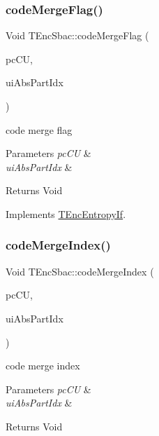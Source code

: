 \subsubsection{\texorpdfstring{code\+Merge\+Flag()}{codeMergeFlag()}}
{\footnotesize\ttfamily Void T\+Enc\+Sbac\+::code\+Merge\+Flag (\begin{DoxyParamCaption}\item[{\hyperlink{class_t_com_data_c_u}{T\+Com\+Data\+CU} $\ast$}]{pc\+CU,  }\item[{U\+Int}]{ui\+Abs\+Part\+Idx }\end{DoxyParamCaption})\hspace{0.3cm}{\ttfamily [virtual]}}

code merge flag 
\begin{DoxyParams}{Parameters}
{\em pc\+CU} & \\
\hline
{\em ui\+Abs\+Part\+Idx} & \\
\hline
\end{DoxyParams}
\begin{DoxyReturn}{Returns}
Void 
\end{DoxyReturn}


Implements \hyperlink{class_t_enc_entropy_if}{T\+Enc\+Entropy\+If}.

\mbox{\label{class_t_enc_sbac_ae0cf04853ab89940fe507d17d2fb7127}} 
\subsubsection{\texorpdfstring{code\+Merge\+Index()}{codeMergeIndex()}}
{\footnotesize\ttfamily Void T\+Enc\+Sbac\+::code\+Merge\+Index (\begin{DoxyParamCaption}\item[{\hyperlink{class_t_com_data_c_u}{T\+Com\+Data\+CU} $\ast$}]{pc\+CU,  }\item[{U\+Int}]{ui\+Abs\+Part\+Idx }\end{DoxyParamCaption})\hspace{0.3cm}{\ttfamily [virtual]}}

code merge index 
\begin{DoxyParams}{Parameters}
{\em pc\+CU} & \\
\hline
{\em ui\+Abs\+Part\+Idx} & \\
\hline
\end{DoxyParams}
\begin{DoxyReturn}{Returns}
Void 
\end{DoxyReturn}


